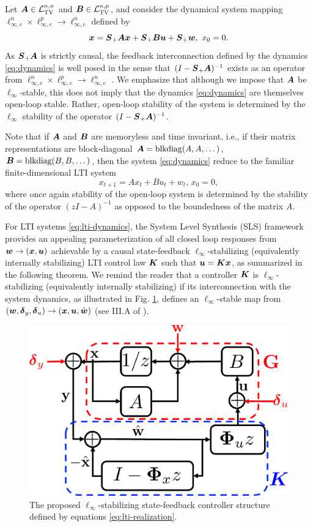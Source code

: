 Let $\boldsymbol{A} \in \mathcal{L}_{\mathrm{TV}}^{n,n}$ and $\boldsymbol{B} \in \mathcal{L}_{\mathrm{TV}}^{n,p}$, and consider the dynamical system mapping $\ell^n_{\infty,e} \times \ell^p_{\infty,e} \to \ell^n_{\infty,e}$ defined by
\begin{equation}
\boldsymbol{x} = \boldsymbol{S}_+\boldsymbol{A}\boldsymbol{x} + \boldsymbol{S}_+ \boldsymbol{B} \boldsymbol{u} + \boldsymbol{S}_+ \boldsymbol{w}, \ x_0 = 0.
\label{eq:dynamics}
\end{equation}
As $\boldsymbol{S}_+\boldsymbol{A}$ is strictly causal, the feedback interconnection defined by the dynamics \eqref{eq:dynamics} is well posed in the sense that $(I-\boldsymbol{S}_+\boldsymbol{A})^{-1}$ exists as an operator from $\ell^n_{\infty,e} \times \ell^p_{\infty,e} \to \ell^n_{\infty,e}$ \cite{dahleh1994control}.  We emphasize that although we impose that $\boldsymbol{A}$ be $\ell_\infty$-stable, this does not imply that the dynamics \eqref{eq:dynamics} are themselves open-loop stable.  Rather, open-loop stability of the system is determined by the $\ell_\infty$ stability of the operator $(I-\boldsymbol{S}_+\boldsymbol{A})^{-1}$.

Note that if $\boldsymbol{A}$ and $\boldsymbol{B}$ are memoryless and time invariant, i.e., if their matrix representations are block-diagonal $\boldsymbol{A} = \mathrm{blkdiag}(A,A,\dots)$, $\boldsymbol{B} = \mathrm{blkdiag}(B,B,\dots)$, then the system \eqref{eq:dynamics} reduce to the familiar finite-dimensional LTI system
\begin{equation}
x_{t+1} = A x_t + Bu_t + w_t, \, x_0 = 0,
\label{eq:lti-dynamics}
\end{equation}
where once again stability of the open-loop system is determined by the stability of the operator $(zI-A)^{-1}$ as opposed to the boundedness of the matrix $A$.

For LTI systems \eqref{eq:lti-dynamics}, the System Level Synthesis (SLS) framework \cite{wang2019system,anderson2019system} provides an appealing parameterization of all closed loop responses from $\boldsymbol{w} \to (\boldsymbol{x}, \boldsymbol{u})$ achievable by a causal state-feedback $\ell_\infty$-stabilizing (equivalently internally stabilizing) LTI control law $\boldsymbol{K}$ such that $\boldsymbol{u} = \boldsymbol{K} \boldsymbol{x}$, as summarized in the following theorem.  We remind the reader that a controller $\boldsymbol{K}$ is $\ell_\infty$-stabilizing (equivalently internally stabilizing) if its interconnection with the system dynamics, as illustrated in Fig. \ref{fig:lti-interconnect}, defines an $\ell_\infty$-stable map from $(\boldsymbol{w}, \boldsymbol{\delta}_y, \boldsymbol{\delta}_u) \to (\boldsymbol{x}, \boldsymbol{u}, \hat{\boldsymbol{w}})$ (see III.A of \cite{wang2019system}).

\begin{figure}
\centering
\includegraphics[width=.325\textwidth]{lti-interconnect}
\caption{The proposed $\ell_\infty$-stabilizing state-feedback controller structure defined by equations \eqref{eq:lti-realization}.}
\label{fig:lti-interconnect}
\end{figure}


